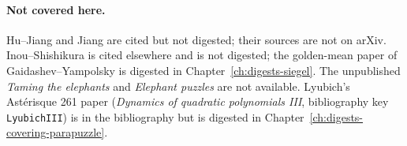 \paragraph{Not covered here.}
Hu--Jiang and Jiang are cited but not digested; their sources are not on arXiv.  Inou--Shishikura is cited
elsewhere and is not digested; the golden-mean paper of Gaidashev--Yampolsky is digested in Chapter~\ref{ch:digests-siegel}.  The unpublished \emph{Taming the elephants} and \emph{Elephant puzzles} are not available.  Lyubich's
Astérisque 261 paper (\emph{Dynamics of quadratic polynomials III}, bibliography key \texttt{LyubichIII}) is in the bibliography but is
digested in Chapter~\ref{ch:digests-covering-parapuzzle}.
